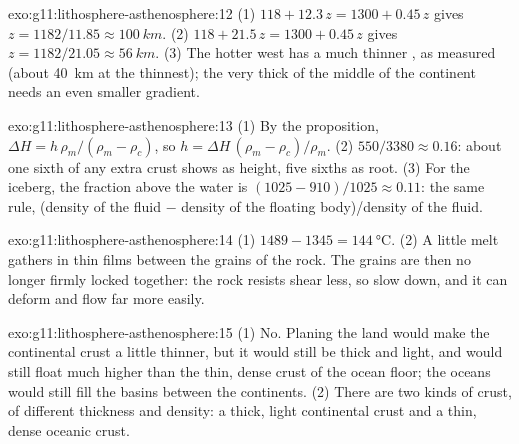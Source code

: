 \begin{solution}{exo:g11:lithosphere-asthenosphere:12}
(1) $118 + 12.3\,z = 1300 + 0.45\,z$ gives $z = 1182/11.85 \approx
\qty{100}{km}$. (2) $118 + 21.5\,z = 1300 + 0.45\,z$ gives $z = 1182/21.05
\approx \qty{56}{km}$. (3) The hotter west has a much thinner ,
as measured (about \qty{40}{km} at the thinnest); the very thick 
of the middle of the continent needs an even smaller gradient.
\end{solution}

\begin{solution}{exo:g11:lithosphere-asthenosphere:13}
(1) By the proposition, $\Delta H = h\,\rho_m/(\rho_m - \rho_c)$, so $h =
\Delta H\,(\rho_m - \rho_c)/\rho_m$. (2) $550/3380 \approx 0.16$: about one
sixth of any extra crust shows as height, five sixths as root. (3) For the
iceberg, the fraction above the water is $(1025 - 910)/1025 \approx 0.11$:
the same rule, (density of the fluid $-$ density of the floating body)/density
of the fluid.
\end{solution}

\begin{solution}{exo:g11:lithosphere-asthenosphere:14}
(1) $1489 - 1345 = \qty{144}{\celsius}$. (2) A little melt gathers in thin
films between the grains of the rock. The grains are then no longer firmly
locked together: the rock resists shear less, so  slow down, and it
can deform and flow far more easily.
\end{solution}

\begin{solution}{exo:g11:lithosphere-asthenosphere:15}
(1) No. Planing the land would make the continental crust a little thinner,
but it would still be thick and light, and would still float much higher than
the thin, dense crust of the ocean floor; the oceans would still fill the
basins between the continents. (2) There are two kinds of crust, of different
thickness and density: a thick, light continental crust and a thin, dense
oceanic crust.
\end{solution}

